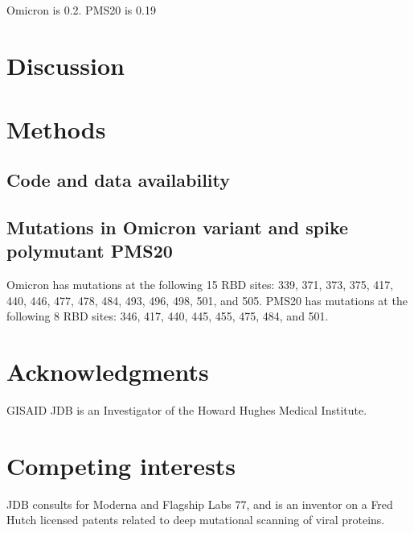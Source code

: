 \documentclass[9pt,twocolumn,twoside]{gsajnl_modified}
\begin{document}
\subsection{}
Omicron is 0.2.
PMS20 is 0.19

\section{Discussion}


{\small

\section{Methods}
\subsection{Code and data availability}

\subsection{Mutations in Omicron variant and spike polymutant PMS20}
Omicron has mutations at the following 15 RBD sites: 339, 371, 373, 375, 417, 440, 446, 477, 478, 484, 493, 496, 498, 501, and 505.
PMS20 has mutations at the following 8 RBD sites: 346, 417, 440, 445, 455, 475, 484, and 501.


\section{Acknowledgments}
{\color{red} GISAID}
JDB is an Investigator of the Howard Hughes Medical Institute.

\section{Competing interests}
JDB consults for Moderna and Flagship Labs 77, and is an inventor on a Fred Hutch licensed patents related to deep mutational scanning of viral proteins.

}


\end{document}
